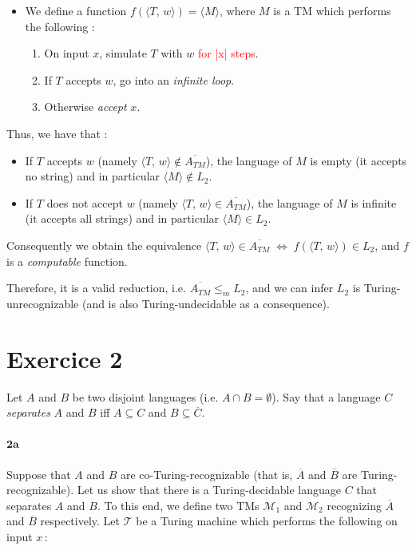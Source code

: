 \documentclass{article}
\begin{document}
\begin{itemize}
    \item We define a function $f(\langle T,\,w\rangle)=\langle M\rangle$, where $M$ is a TM which performs the following :
    \begin{enumerate}
        \item On input $x$, simulate $T$ with $w$ \textcolor{red}{for |x| steps}.
        \item If $T$ accepts $w$, go into an \textit{infinite loop}.
        \item Otherwise \textit{accept} $x$.
    \end{enumerate}
\end{itemize}

\noindent Thus, we have that :
\begin{itemize}
    \item If $T$ accepts $w$ (namely $\langle T,\,w\rangle\notin\overline{A_{TM}}$), the language of $M$ is empty (it accepts no string) and in particular $\langle M\rangle\notin L_2$.
    \item If $T$ does not accept $w$ (namely $\langle T,\,w\rangle\in\overline{A_{TM}}$), the language of $M$ is infinite (it accepts all strings) and in particular $\langle M\rangle\in L_2$.
\end{itemize}
Consequently we obtain the equivalence $\langle T,\,w\rangle\in\overline{A_{TM}}\;\Leftrightarrow\; f(\langle T,\,w\rangle)\in L_2$, and $f$ is a \textit{computable} function.

Therefore, it is a valid reduction, i.e. $\overline{A_{TM}}\le_m L_2$, and we can infer $L_2$ is Turing-unrecognizable (and is also Turing-undecidable as a consequence).

\newpage
\section*{Exercice 2}
Let $A$ and $B$ be two disjoint languages (i.e. $A\cap B =\emptyset$). Say that a language $C$ \textit{separates} $A$ and $B$ iff $A\subseteq C$ and $B\subseteq \overline{C}$. 
\paragraph{$\mathbf{2a}$} Suppose that $A$ and $B$ are co-Turing-recognizable (that is, $\overline{A}$ and  $\overline{B}$ are Turing-recognizable). 
Let us show that there is a Turing-decidable language $C$ that separates $A$ and $B$.\newline\linebreak 
To this end, we define two TMs $\mathcal{M}_1$ and $\mathcal{M}_2$ recognizing $\overline{A}$ and $\overline{B}$ respectively. Let $\mathcal{T}$ be a Turing machine which performs the following on input $x\,\colon$
\end{document}
